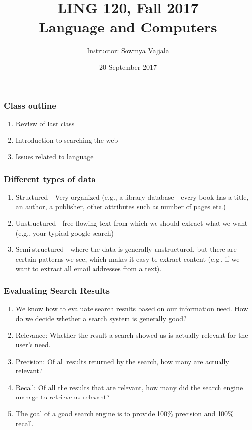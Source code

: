\documentclass{beamer}
\author[Sowmya Vajjala]{Instructor: Sowmya Vajjala}
\title[LING 120]{LING 120, Fall 2017 \\ Language and Computers}
\date{20 September 2017}
\institute{Iowa State University, USA}
\begin{document}
\begin{frame}\titlepage
\end{frame}

\begin{frame}
\frametitle{Class outline}%
\begin{enumerate}
\item Review of last class
\item Introduction to searching the web
\item Issues related to language
\end{enumerate}
\end{frame}

\begin{frame}
\frametitle{Different types of data}%
\begin{enumerate}
\item Structured - Very organized (e.g., a library database - every book has a title, an author, a publisher, other attributes such as number of pages etc.)
\item Unstructured - free-flowing text from which we should extract what we want (e.g., your typical google search)
\item Semi-structured - where the data is generally unstructured, but there are certain patterns we see, which makes it easy to extract content (e.g., if we want to extract all email addresses from a text).
\end{enumerate}
\end{frame}

\begin{frame}
\frametitle{Evaluating Search Results}%
\begin{enumerate}
\item We know how to evaluate search results based on our information need. How do we decide whether a search system is generally good? \pause
\item Relevance: Whether the result a search showed us is actually relevant for the user's need. \pause
\item Precision: Of all results returned by the search, how many are actually relevant?
\item Recall: Of all the results that are relevant, how many did the search engine manage to retrieve as relevant? 
\item The goal of a good search engine is to provide 100\% precision and 100\% recall. 
\end{enumerate}
\end{frame}
\end{document}
